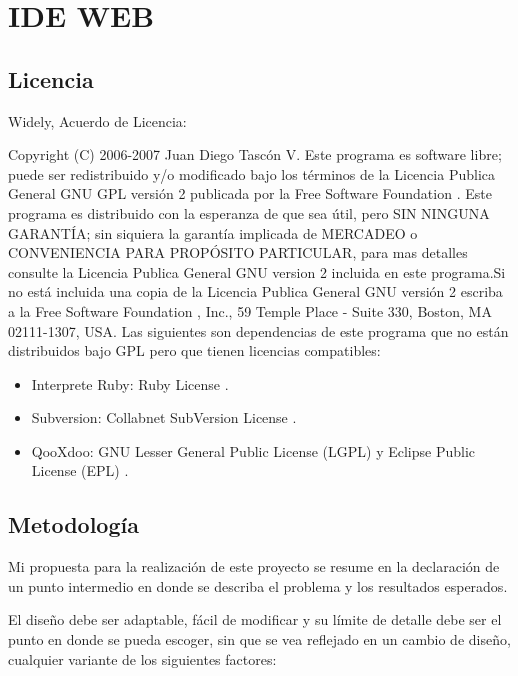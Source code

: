 \section{IDE WEB}

\subsection{Licencia}

Widely, Acuerdo de Licencia:

Copyright (C) 2006-2007 Juan Diego Tascón V. \newline Este programa es software libre; puede ser redistribuido y/o modificado bajo los términos de la Licencia Publica General GNU GPL versión 2 \cite{gpl} publicada por la Free Software Foundation \cite{fsf}. \newline Este programa es distribuido con la esperanza de que sea útil, pero SIN NINGUNA GARANTÍA; sin siquiera la garantía implicada de MERCADEO o CONVENIENCIA PARA PROPÓSITO PARTICULAR, para mas detalles consulte la Licencia Publica General GNU version 2 incluida en este programa.\newline Si no está incluida una copia de la Licencia Publica General GNU versión 2 \cite{gpl} escriba a la Free Software Foundation \cite{fsf}, Inc., 59 Temple Place - Suite 330, Boston, MA  02111-1307, USA. \newline Las siguientes son dependencias de este programa que no están distribuidos bajo GPL pero que tienen licencias compatibles:

\begin{itemize}
	\item Interprete Ruby: Ruby License \cite{ruby_lic}.
	\item Subversion: Collabnet SubVersion License \cite{svn_lic}.
	\item QooXdoo: GNU Lesser General Public License (LGPL) \cite{lgpl} y Eclipse Public License (EPL) \cite{epl}.
\end{itemize}

\subsection{Metodología}

Mi propuesta para la realización de este proyecto se resume en la declaración de un punto intermedio en donde se describa el problema y los resultados esperados.

El diseño debe ser adaptable, fácil de modificar y su límite de detalle debe ser el punto en donde se pueda escoger, sin que se vea reflejado en un cambio de diseño, cualquier variante de los siguientes factores:

